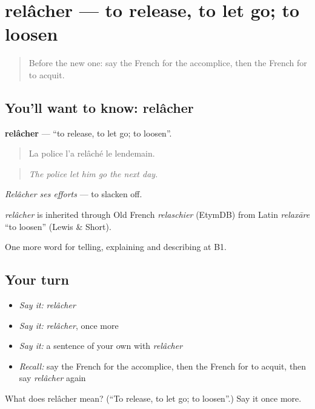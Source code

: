 \section[relâcher]{relâcher — to release, to let go; to loosen}

\label{lesson:FR-C295-relacher}



\begin{quote}
Before the new one: say the French for the accomplice, then the French for to acquit.
\end{quote}

\subsection*{You'll want to know: relâcher}
\textbf{relâcher} — \textquotedblleft{}to release, to let go; to loosen\textquotedblright{}.

\begin{quote}
La police l'a relâché le lendemain.
\end{quote}

\begin{quote}
\emph{The police let him go the next day.}
\end{quote}

\emph{Relâcher ses efforts} — to slacken off.

\begin{cousinweb}
\emph{relâcher} is inherited through Old French \emph{relaschier} (EtymDB) from Latin \emph{relaxāre} \textquotedblleft{}to loosen\textquotedblright{} (Lewis \& Short).
\end{cousinweb}

\begin{grammarlens}[title={What you've built}]
One more word for telling, explaining and describing at B1.
\end{grammarlens}

\subsection*{Your turn}
\begin{itemize}
\raggedright
  \item \emph{Say it:} \emph{relâcher}
  \item \emph{Say it:} \emph{relâcher}, once more
  \item \emph{Say it:} a sentence of your own with \emph{relâcher}
  \item \emph{Recall:} say the French for the accomplice, then the French for to acquit, then say \emph{relâcher} again
\end{itemize}

\begin{tcolorbox}[breakable,colback=teal!4,colframe=teal!35!black,title={Before you move on}]
What does relâcher mean? (\textquotedblleft{}To release, to let go; to loosen\textquotedblright{}.) Say it once more.
\end{tcolorbox}
